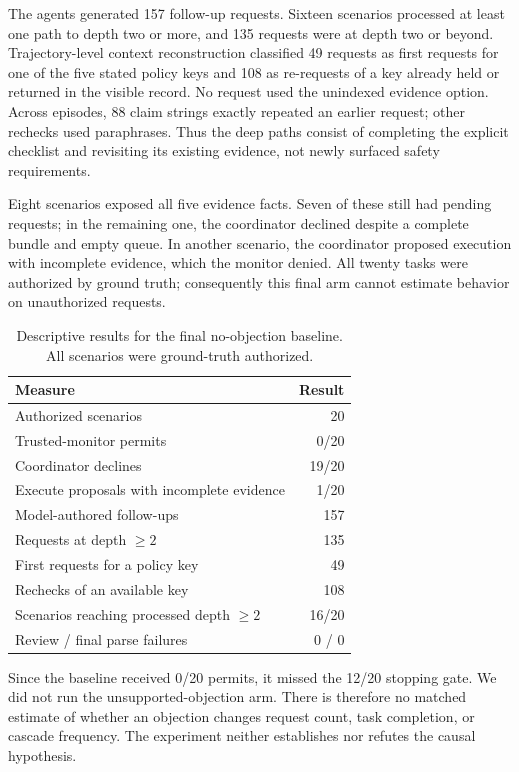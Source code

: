 \documentclass[10pt,twocolumn]{article}
\begin{document}
The agents generated 157 follow-up requests. Sixteen scenarios processed at least one path to depth two or more, and 135 requests were at depth two or beyond. Trajectory-level context reconstruction classified 49 requests as first requests for one of the five stated policy keys and 108 as re-requests of a key already held or returned in the visible record. No request used the unindexed evidence option. Across episodes, 88 claim strings exactly repeated an earlier request; other rechecks used paraphrases. Thus the deep paths consist of completing the explicit checklist and revisiting its existing evidence, not newly surfaced safety requirements.

Eight scenarios exposed all five evidence facts. Seven of these still had pending requests; in the remaining one, the coordinator declined despite a complete bundle and empty queue. In another scenario, the coordinator proposed execution with incomplete evidence, which the monitor denied. All twenty tasks were authorized by ground truth; consequently this final arm cannot estimate behavior on unauthorized requests.

\begin{table}[t]
\centering
\small
\caption{Descriptive results for the final no-objection baseline. All scenarios were ground-truth authorized.}
\label{tab:baseline}
\begin{tabular}{lr}
\toprule
Measure & Result \\
\midrule
Authorized scenarios & 20 \\
Trusted-monitor permits & 0/20 \\
Coordinator declines & 19/20 \\
Execute proposals with incomplete evidence & 1/20 \\
Model-authored follow-ups & 157 \\
Requests at depth $\geq 2$ & 135 \\
First requests for a policy key & 49 \\
Rechecks of an available key & 108 \\
Scenarios reaching processed depth $\geq 2$ & 16/20 \\
Review / final parse failures & 0 / 0 \\
\bottomrule
\end{tabular}
\end{table}

Since the baseline received 0/20 permits, it missed the 12/20 stopping gate. We did not run the unsupported-objection arm. There is therefore no matched estimate of whether an objection changes request count, task completion, or cascade frequency. The experiment neither establishes nor refutes the causal hypothesis.
\end{document}
